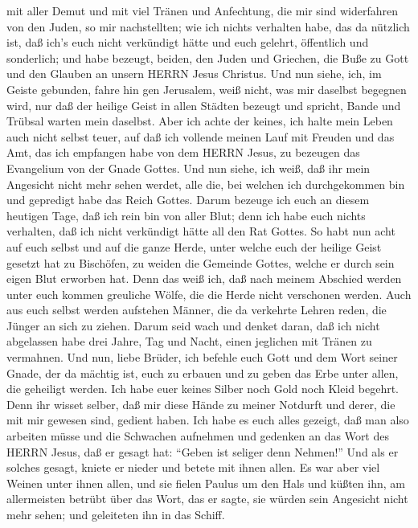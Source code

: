 mit aller Demut und mit viel Tränen und Anfechtung, die mir sind
widerfahren von den Juden, so mir nachstellten;  wie ich
nichts verhalten habe, das da nützlich ist, daß ich's euch nicht
verkündigt hätte und euch gelehrt, öffentlich und sonderlich;
 und habe bezeugt, beiden, den Juden und Griechen, die Buße
zu Gott und den Glauben an unsern HERRN Jesus Christus. 
Und nun siehe, ich, im Geiste gebunden, fahre hin gen Jerusalem, weiß
nicht, was mir daselbst begegnen wird,  nur daß der heilige
Geist in allen Städten bezeugt und spricht, Bande und Trübsal warten
mein daselbst.  Aber ich achte der keines, ich halte mein
Leben auch nicht selbst teuer, auf daß ich vollende meinen Lauf mit
Freuden und das Amt, das ich empfangen habe von dem HERRN Jesus, zu
bezeugen das Evangelium von der Gnade Gottes.  Und nun
siehe, ich weiß, daß ihr mein Angesicht nicht mehr sehen werdet, alle
die, bei welchen ich durchgekommen bin und gepredigt habe das Reich
Gottes.  Darum bezeuge ich euch an diesem heutigen Tage,
daß ich rein bin von aller Blut;  denn ich habe euch nichts
verhalten, daß ich nicht verkündigt hätte all den Rat Gottes.
 So habt nun acht auf euch selbst und auf die ganze Herde,
unter welche euch der heilige Geist gesetzt hat zu Bischöfen, zu weiden
die Gemeinde Gottes, welche er durch sein eigen Blut erworben hat.
 Denn das weiß ich, daß nach meinem Abschied werden unter
euch kommen greuliche Wölfe, die die Herde nicht verschonen werden.
 Auch aus euch selbst werden aufstehen Männer, die da
verkehrte Lehren reden, die Jünger an sich zu ziehen. 
Darum seid wach und denket daran, daß ich nicht abgelassen habe drei
Jahre, Tag und Nacht, einen jeglichen mit Tränen zu vermahnen.
 Und nun, liebe Brüder, ich befehle euch Gott und dem Wort
seiner Gnade, der da mächtig ist, euch zu erbauen und zu geben das Erbe
unter allen, die geheiligt werden.  Ich habe euer keines
Silber noch Gold noch Kleid begehrt.  Denn ihr wisset
selber, daß mir diese Hände zu meiner Notdurft und derer, die mit mir
gewesen sind, gedient haben.  Ich habe es euch alles
gezeigt, daß man also arbeiten müsse und die Schwachen aufnehmen und
gedenken an das Wort des HERRN Jesus, daß er gesagt hat: ``Geben ist
seliger denn Nehmen!''  Und als er solches gesagt, kniete
er nieder und betete mit ihnen allen.  Es war aber viel
Weinen unter ihnen allen, und sie fielen Paulus um den Hals und küßten
ihn,  am allermeisten betrübt über das Wort, das er sagte,
sie würden sein Angesicht nicht mehr sehen; und geleiteten ihn in das
Schiff.

